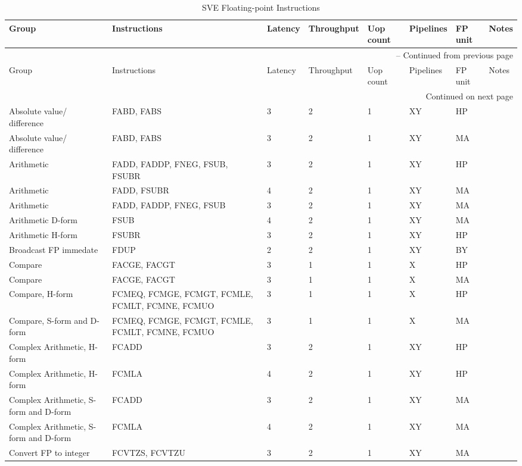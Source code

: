 \newpage
\begin{longtable}{|p{1in}|p{1in}|l|l|l|p{1in}|l|p{1in}|}
\caption{SVE Floating-point Instructions} \\
\hline
Group & Instructions & Latency & Throughput & Uop count & Pipelines & FP unit & Notes\\
\hline
\endfirsthead
\hline
\multicolumn{8}{|r|}{{\tablename\ \thetable{} -- Continued from previous page}} \\
\hline
Group & Instructions & Latency & Throughput & Uop count & Pipelines & FP unit & Notes\\
\hline
\endhead
\hline
\multicolumn{8}{|r|}{{Continued on next page}} \\
\hline
\endfoot
\hline
\endlastfoot
Absolute value/ difference & FABD, FABS & 3 & 2 & 1 & XY & HP & \\
\hline
Absolute value/ difference & FABD, FABS & 3 & 2 & 1 & XY & MA & \\
\hline
Arithmetic & FADD, FADDP, FNEG, FSUB, FSUBR & 3 & 2 & 1 & XY & HP & \\
\hline
Arithmetic & FADD, FSUBR & 4 & 2 & 1 & XY & MA & \\
\hline
Arithmetic & FADD, FADDP, FNEG, FSUB & 3 & 2 & 1 & XY & MA & \\
\hline
Arithmetic D-form & FSUB & 4 & 2 & 1 & XY & MA & \\
\hline
Arithmetic H-form & FSUBR & 3 & 2 & 1 & XY & HP & \\
\hline
Broadcast FP immedate & FDUP & 2 & 2 & 1 & XY & BY & \\
\hline
Compare & FACGE, FACGT & 3 & 1 & 1 & X & HP & \\
\hline
Compare & FACGE, FACGT & 3 & 1 & 1 & X & MA & \\
\hline
Compare, H-form & FCMEQ, FCMGE, FCMGT, FCMLE, FCMLT, FCMNE, FCMUO & 3 & 1 & 1 & X & HP & \\
\hline
Compare, S-form and D-form & FCMEQ, FCMGE, FCMGT, FCMLE, FCMLT, FCMNE, FCMUO & 3 & 1 & 1 & X & MA & \\
\hline
Complex Arithmetic, H-form & FCADD & 3 & 2 & 1 & XY & HP & \\
\hline
Complex Arithmetic, H-form & FCMLA & 4 & 2 & 1 & XY & HP & \\
\hline
Complex Arithmetic, S-form and D-form & FCADD & 3 & 2 & 1 & XY & MA & \\
\hline
Complex Arithmetic, S-form and D-form & FCMLA & 4 & 2 & 1 & XY & MA & \\
\hline
Convert FP to integer & FCVTZS, FCVTZU & 3 & 2 & 1 & XY & MA & \\

\end{longtable}
